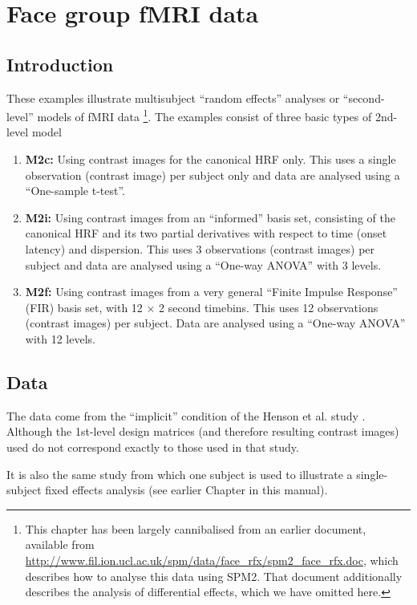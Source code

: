\chapter{Face group fMRI data \label{Chap:data:faces_group}}

\section{Introduction}

These examples illustrate multisubject ``random effects'' analyses or ``second-level'' models of fMRI data \cite{will_hbf2_rfx}\footnote{This chapter has been largely cannibalised from an earlier document, available from \url{http://www.fil.ion.ucl.ac.uk/spm/data/face_rfx/spm2_face_rfx.doc}, which describes how to analyse this data using SPM2. That document additionally describes the analysis of differential effects, which we have omitted here.}. 
The examples consist of three basic types of 2nd-level model
\begin{enumerate}
\item \textbf{M2c:} Using contrast images for the canonical HRF only. This uses a single observation (contrast image) per subject only and data are analysed using a ``One-sample t-test''.
\item \textbf{M2i:} Using contrast images from an ``informed'' basis set, consisting of the canonical HRF and its two partial derivatives with respect to time (onset latency) and dispersion. This uses 3 observations (contrast images) per subject and data are analysed using a ``One-way ANOVA'' with 3 levels.
\item \textbf{M2f:} Using contrast images from a very general ``Finite Impulse Response'' (FIR) basis set, with 12 $\times$ 2 second timebins. This uses 12 observations (contrast images) per subject. Data are analysed using a ``One-way ANOVA'' with 12 levels.
\end{enumerate}

\section{Data}

The data come from the ``implicit'' condition of the Henson et al. study \cite{rnah_face_rep}. Although the 1st-level design matrices (and therefore resulting contrast images) used do not correspond exactly to those used in that study.

It is also the same study from which one subject is used to illustrate a single-subject fixed effects analysis (see earlier Chapter in this manual).

